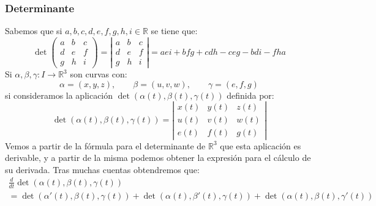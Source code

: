 \subsubsection{Determinante}
\noindent
Sabemos que si $a,b,c,d,e,f,g,h,i \in \mathbb{R}$ se tiene que:
\begin{equation*}
    \det\left(\begin{array}{ccc}
        a & b & c \\
        d & e & f \\
        g & h & i
    \end{array}\right) = \left|\begin{array}{ccc}
        a & b & c \\
        d & e & f \\
        g & h & i
    \end{array}\right| = aei + bfg + cdh - ceg - bdi - fha
\end{equation*}
Si $\alpha,\beta,\gamma:I\to\mathbb{R}^3$ son curvas con:
\begin{equation*}
    \alpha=(x,y,z), \qquad \beta = (u,v,w), \qquad \gamma = (e,f,g)
\end{equation*}
si consideramos la aplicación $\det(\alpha(t),\beta(t),\gamma(t))$ definida por:
\begin{equation*}
    \det(\alpha(t),\beta(t),\gamma(t)) = \left|\begin{array}{ccc}
        x(t) & y(t) & z(t) \\
        u(t) & v(t) & w(t) \\
        e(t) & f(t) & g(t)
    \end{array}\right| 
\end{equation*}
Vemos a partir de la fórmula para el determinante de $\mathbb{R}^3$ que esta aplicación es derivable, y a partir de la misma podemos obtener la expresión para el cálculo de su derivada. Tras muchas cuentas obtendremos que:
\begin{multline*}
    \frac{d}{dt} \det(\alpha(t),\beta(t),\gamma(t)) \\ = \det(\alpha'(t),\beta(t),\gamma(t)) + \det(\alpha(t),\beta'(t),\gamma(t)) + \det(\alpha(t),\beta(t),\gamma'(t))
\end{multline*}

